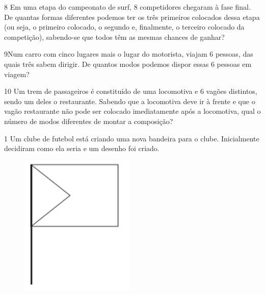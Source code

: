 

\num{8} Em uma etapa do campeonato de surf, 8 competidores chegaram à fase
final. De quantas formas diferentes podemos ter os três primeiros
colocados dessa etapa (ou seja, o primeiro colocado, o segundo e,
finalmente, o terceiro colocado da competição), sabendo-se que todos
têm as mesmas chances de ganhar?



\num{9}Num carro com cinco lugares mais o lugar do motorista, viajam 6
pessoas, das quais três sabem dirigir. De quantos modos podemos dispor
essas 6 pessoas em viagem?



\num{10} Um trem de passageiros é constituído de uma locomotiva e 6 vagões
distintos, sendo um deles o restaurante. Sabendo que a locomotiva deve ir
à frente e que o vagão restaurante não pode ser colocado imediatamente
após a locomotiva, qual o número de modos diferentes de montar a composição?




\num{1} Um clube de futebol está criando uma nova bandeira para o clube.
Inicialmente decidiram como ela seria e um desenho foi criado.

\begin{figure}[htpb!]
\includegraphics[width=.5\textwidth]{./imgs/mat16.png}
\end{figure}

